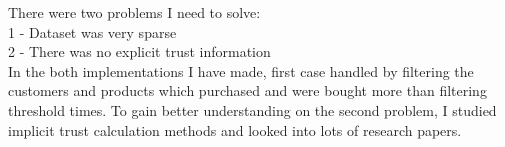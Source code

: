 	There were two problems I need to solve: \\
	1 - Dataset was very sparse \\ 
	2 - There was no explicit trust information \\
	In the both implementations I have made, first case handled by filtering the customers and products which purchased and were bought more than filtering threshold times. To gain better understanding on the second problem, I studied implicit trust calculation methods and looked into lots of research papers.